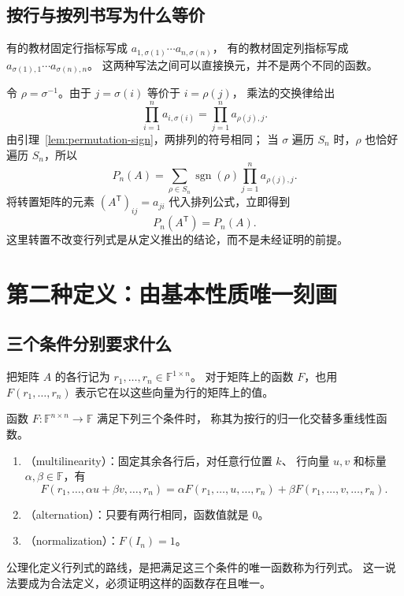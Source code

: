 \documentclass[UTF8,12pt,a4paper,fontset=fandol]{ctexart}
\begin{document}
\subsection{按行与按列书写为什么等价}

有的教材固定行指标写成 $a_{1,\sigma(1)}\cdots a_{n,\sigma(n)}$，
有的教材固定列指标写成 $a_{\sigma(1),1}\cdots a_{\sigma(n),n}$。
这两种写法之间可以直接换元，并不是两个不同的函数。

令 $\rho=\sigma^{-1}$。由于 $j=\sigma(i)$ 等价于 $i=\rho(j)$，
乘法的交换律给出
\[
  \prod_{i=1}^{n}a_{i,\sigma(i)}
  =\prod_{j=1}^{n}a_{\rho(j),j}.
\]
由引理~\ref{lem:permutation-sign}，两排列的符号相同；
当 $\sigma$ 遍历 $S_n$ 时，$\rho$ 也恰好遍历 $S_n$，所以
\begin{equation}
  P_n(A)=\sum_{\rho\in S_n}\operatorname{sgn}(\rho)
  \prod_{j=1}^{n}a_{\rho(j),j}.
  \label{eq:column-permutation}
\end{equation}
将转置矩阵的元素 $(A^{\mathsf T})_{ij}=a_{ji}$ 代入排列公式，立即得到
\begin{equation}
  P_n(A^{\mathsf T})=P_n(A).
  \label{eq:transpose-invariance}
\end{equation}
这里转置不改变行列式是从定义推出的结论，而不是未经证明的前提。

\section{第二种定义：由基本性质唯一刻画}
\label{sec:axiomatic-definition}

\subsection{三个条件分别要求什么}

把矩阵 $A$ 的各行记为 $r_1,\ldots,r_n\in\mathbb F^{1\times n}$。
对于矩阵上的函数 $F$，也用 $F(r_1,\ldots,r_n)$ 表示它在以这些向量为行的矩阵上的值。

\begin{definition}[归一化的交替多重线性函数]
\label{def:axioms}
函数 $F:\mathbb F^{n\times n}\to\mathbb F$ 满足下列三个条件时，
称其为按行的归一化交替多重线性函数。
\begin{enumerate}
  \item {}（multilinearity）：固定其余各行后，对任意行位置 $k$、
  行向量 $u,v$ 和标量 $\alpha,\beta\in\mathbb F$，有
  \begin{equation}
    F(r_1,\ldots,\alpha u+\beta v,\ldots,r_n)
    =\alpha F(r_1,\ldots,u,\ldots,r_n)
     +\beta F(r_1,\ldots,v,\ldots,r_n).
    \label{eq:row-multilinearity}
  \end{equation}
  \item {}（alternation）：只要有两行相同，函数值就是 $0$。
  \item {}（normalization）：$F(I_n)=1$。
\end{enumerate}
公理化定义行列式的路线，是把满足这三个条件的唯一函数称为行列式。
这一说法要成为合法定义，必须证明这样的函数存在且唯一。
\end{definition}
\end{document}

